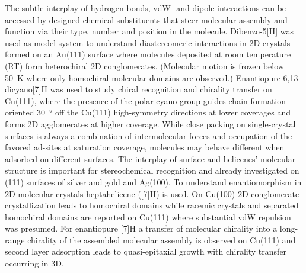The subtle interplay of hydrogen bonds, vdW- and dipole interactions can be accessed by designed chemical substituents that steer molecular assembly and function via their type, number and position in the molecule. Dibenzo-5[H] was used as model system to understand diastereomeric interactions in 2D crystals formed on an Au(111) surface where molecules deposited at room temperature (RT) form heterochiral 2D conglomerates.\cite{Seibel_Chiral_2013} (Molecular motion is frozen below \SI{50}{\kelvin} where only homochiral molecular domains are observed.) Enantiopure 6,13-dicyano[7]H was used to study chiral recognition and chirality transfer on Cu(111)\cite{Shchyrba_Chirality_2013, Stoehr_Self-assembly_2011}, where the presence of the polar cyano group guides chain formation oriented \SI{30}{\degree} off the Cu(111) high-symmetry directions at lower coverages and forms 2D agglomerates at higher coverage. While close packing on single-crystal surfaces is always a combination of intermolecular forces and occupation of the favored ad-sites at saturation coverage, molecules may behave different when adsorbed on different surfaces. The interplay of surface and helicenes’ molecular structure is important for stereochemical recognition\cite{Ernst_Stereochemical_2016} and already investigated on (111) surfaces of silver and gold\cite{Seibel_Two-dimensional_2014} and Ag(100)\cite{Seibel_Homochiral_2015}. To understand enantiomorphism in 2D molecular crystals heptahelicene ([7]H) is used.\cite{Parschau_coverage_2008, Fasel_Amplification_2006} On Cu(100) 2D conglomerate crystallization leads to homochiral domains\cite{Seibel_conglomerate_2014} while racemic crystals\cite{Fasel_Amplification_2006} and separated homochiral domains\cite{Ernst_two-dimensional_2001} are reported on Cu(111) where substantial vdW repulsion was presumed. For enantiopure [7]H a transfer of molecular chirality into a long-range chirality of the assembled molecular assembly is observed on Cu(111)\cite{Fasel_Chirality_2003} and second layer adsorption leads to quasi-epitaxial growth with chirality transfer occurring in 3D.\cite{Parschau_Chirality_2010}


